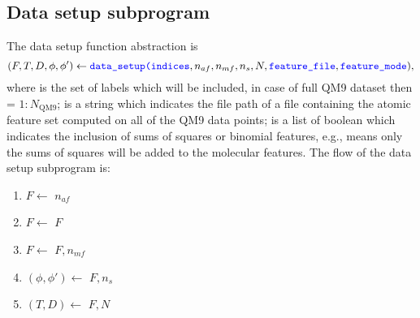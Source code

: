 \documentclass[12pt]{article}
\begin{document}
\subsection{Data setup subprogram}
\label{sub:data}
The data setup function abstraction is
\begin{equation*}
	(F, T, D, \phi, \phi') \leftarrow \codeword{data_setup(indices}, n_{af}, n_{mf}, n_s, N, \codeword{feature_file}, \codeword{feature_mode}),
\end{equation*}
where  is the set of labels which will be included, in case of full QM9 dataset then  = $1:N_\text{QM9}$;  is a string which indicates the file path of a file containing the atomic feature set computed on all of the QM9 data points;  is a list of boolean which indicates the inclusion of sums of squares or binomial features, e.g.,  means only the sums of squares will be added to the molecular features. The flow of the data setup subprogram is:
\begin{enumerate}
	\item $F \leftarrow$  $n_{af}$\codeword{)}
	\item $F \leftarrow$ $F$
	\item $F \leftarrow$ $F, n_{mf}$\codeword{)}
	\item $(\phi, \phi') \leftarrow$ $F, n_s$\codeword{)} 
	\item $(T, D) \leftarrow$ $F, N$\codeword{)}
\end{enumerate}
\end{document}
